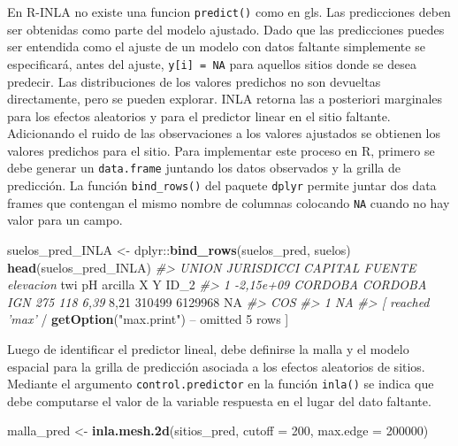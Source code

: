 \documentclass[11pt,b5paper,]{krantz}
\newenvironment{Shaded}{}{}
\newcommand{\CommentTok}[1]{\textcolor[rgb]{0.38,0.63,0.69}{\textit{#1}}}
\newcommand{\DataTypeTok}[1]{\textcolor[rgb]{0.56,0.13,0.00}{#1}}
\newcommand{\DecValTok}[1]{\textcolor[rgb]{0.25,0.63,0.44}{#1}}
\newcommand{\KeywordTok}[1]{\textcolor[rgb]{0.00,0.44,0.13}{\textbf{#1}}}
\newcommand{\NormalTok}[1]{#1}
\newcommand{\OperatorTok}[1]{\textcolor[rgb]{0.40,0.40,0.40}{#1}}
\newcommand{\OtherTok}[1]{\textcolor[rgb]{0.00,0.44,0.13}{#1}}
\newcommand{\StringTok}[1]{\textcolor[rgb]{0.25,0.44,0.63}{#1}}
\begin{document}
En R-INLA no existe una funcion \texttt{predict()} como en gls. Las predicciones deben ser obtenidas como parte del modelo ajustado. Dado que las predicciones puedes ser entendida como el ajuste de un modelo con datos faltante simplemente se especificará, antes del ajuste, \texttt{y{[}i{]}\ =\ NA} para aquellos sitios donde se desea predecir. Las distribuciones de los valores predichos no son devueltas directamente, pero se pueden explorar. INLA retorna las a posteriori marginales para los efectos aleatorios y para el predictor linear en el sitio faltante. Adicionando el ruido de las observaciones a los valores ajustados se obtienen los valores predichos para el sitio. Para implementar este proceso en R, primero se debe generar un \texttt{data.frame} juntando los datos observados y la grilla de predicción. La función \texttt{bind\_rows()} del paquete \texttt{dplyr} permite juntar dos data frames que contengan el mismo nombre de columnas colocando \texttt{NA} cuando no hay valor para un campo.

\begin{Shaded}
\begin{Highlighting}[]
\NormalTok{suelos_pred_INLA <-}\StringTok{ }\NormalTok{dplyr}\OperatorTok{::}\KeywordTok{bind_rows}\NormalTok{(suelos_pred,}
\NormalTok{                                     suelos)}
\KeywordTok{head}\NormalTok{(suelos_pred_INLA)}
\CommentTok{#> UNION JURISDICCI CAPITAL FUENTE elevacion}
\NormalTok{twi pH arcilla X Y ID_}\DecValTok{2}
\CommentTok{#> 1 -2,15e+09 CORDOBA CORDOBA IGN 275 118 6,39}
\DecValTok{8}\NormalTok{,}\DecValTok{21} \DecValTok{310499} \DecValTok{6129968} \OtherTok{NA}
\CommentTok{#> COS}
\CommentTok{#> 1 NA}
\CommentTok{#> [ reached 'max'}
    \OperatorTok{/}\StringTok{ }\KeywordTok{getOption}\NormalTok{(}\StringTok{"max.print"}\NormalTok{) }\OperatorTok{--}
\NormalTok{omitted }\DecValTok{5}\NormalTok{ rows ]}
\end{Highlighting}
\end{Shaded}

Luego de identificar el predictor lineal, debe definirse la malla y el modelo espacial para la grilla de predicción asociada a los efectos aleatorios de sitios. Mediante el argumento \texttt{control.predictor} en la función \texttt{inla()} se indica que debe computarse el valor de la variable respuesta en el lugar del dato faltante.

\begin{Shaded}
\begin{Highlighting}[]
\NormalTok{malla_pred <-}\StringTok{ }\KeywordTok{inla.mesh.2d}\NormalTok{(sitios_pred, }
                           \DataTypeTok{cutoff =} \DecValTok{200}\NormalTok{,}
                           \DataTypeTok{max.edge =} \DecValTok{200000}\NormalTok{)}
\end{Highlighting}
\end{Shaded}
\end{document}
